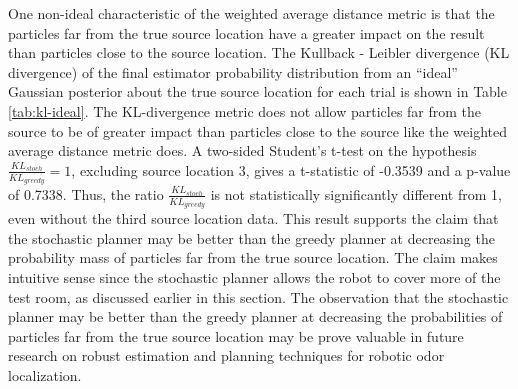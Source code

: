 \documentclass[submit, 12pt]{aiaa-pretty-modified}
\begin{document}
One non-ideal characteristic of the weighted average distance metric
is that the particles far from the true source location have a greater
impact on the result than particles close to the source location.
The Kullback - Leibler divergence (KL divergence) of the final estimator
probability distribution from an ``ideal'' Gaussian posterior about
the true source location for each trial is shown in Table
\ref{tab:kl-ideal}.  The KL-divergence metric does not allow particles far from
the source to be of greater impact than particles close to the source
like the weighted average distance metric does.  A
two-sided Student's t-test on the hypothesis
$\frac{KL_{stoch}}{KL_{greedy}} = 1$, excluding source location 3, gives a t-statistic of -0.3539 and
a p-value of 0.7338.  Thus, the ratio $\frac{KL_{stoch}}{KL_{greedy}}$
is not statistically significantly different from 1, even without the
third source location data.  This result supports the claim that the
stochastic planner may be better than the greedy planner at decreasing the probability mass of
particles far from the true source location.  The claim makes
intuitive sense since the stochastic planner allows the robot to cover
more of the test room, as discussed earlier in this section.  The
observation that the stochastic planner may be better than the greedy
planner at decreasing the probabilities of particles far from the true
source location may be prove valuable in future research on robust
estimation and planning techniques for robotic odor localization.


\begin{table}[htb]
\centering
{}
\caption{Kullback-Leibler divergence of the final particle filter
  posterior distribution from an 'ideal' Gaussion posterior distribution . }
\label{tab:kl-ideal}
\end{table}
\end{document}
